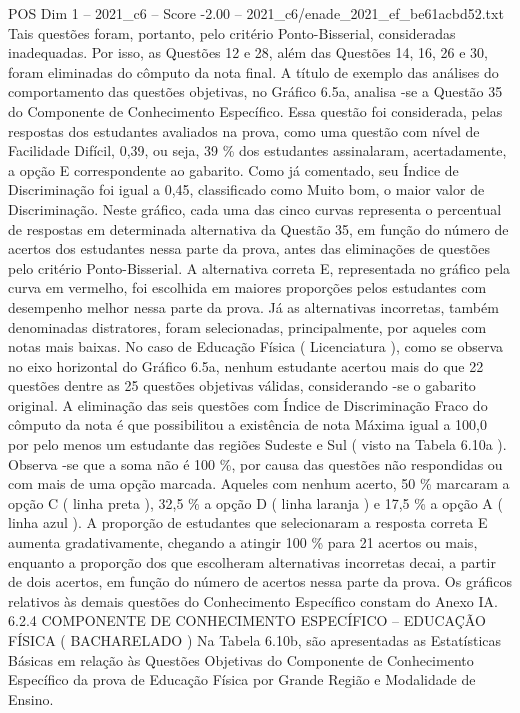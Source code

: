 \begin{textsample}{POS Dim 1 – 2021\_c6 – Score -2.00 – 2021\_c6/enade\_2021\_ef\_be61acbd52.txt}
Tais questões foram, portanto, pelo critério Ponto-Bisserial, consideradas inadequadas.
Por isso, as Questões 12 e 28, além das Questões 14, 16, 26 e 30, foram eliminadas do cômputo da nota final.
A título de exemplo das análises do comportamento das questões objetivas, no Gráfico 6.5a, analisa -se a Questão 35 do Componente de Conhecimento Específico.
Essa questão foi considerada, pelas respostas dos estudantes avaliados na prova, como uma questão com nível de Facilidade Difícil, 0,39, ou seja, 39 \% dos estudantes assinalaram, acertadamente, a opção E correspondente ao gabarito.
Como já comentado, seu Índice de Discriminação foi igual a 0,45, classificado como Muito bom, o maior valor de Discriminação.
Neste gráfico, cada uma das cinco curvas representa o percentual de respostas em determinada alternativa da Questão 35, em função do número de acertos dos estudantes nessa parte da prova, antes das eliminações de questões pelo critério Ponto-Bisserial.
A alternativa correta E, representada no gráfico pela curva em vermelho, foi escolhida em maiores proporções pelos estudantes com desempenho melhor nessa parte da prova.
Já as alternativas incorretas, também denominadas distratores, foram selecionadas, principalmente, por aqueles com notas mais baixas.
No caso de Educação Física ( Licenciatura ), como se observa no eixo horizontal do Gráfico 6.5a, nenhum estudante acertou mais do que 22 questões dentre as 25 questões objetivas válidas, considerando -se o gabarito original.
A eliminação das seis questões com Índice de Discriminação Fraco do cômputo da nota é que possibilitou a existência de nota Máxima igual a 100,0 por pelo menos um estudante das regiões Sudeste e Sul ( visto na Tabela 6.10a ).
Observa -se que a soma não é 100 \%, por causa das questões não respondidas ou com mais de uma opção marcada.
Aqueles com nenhum acerto, 50 \% marcaram a opção C ( linha preta ), 32,5 \% a opção D ( linha laranja ) e 17,5 \% a opção A ( linha azul ).
A proporção de estudantes que selecionaram a resposta correta E aumenta gradativamente, chegando a atingir 100 \% para 21 acertos ou mais, enquanto a proporção dos que escolheram alternativas incorretas decai, a partir de dois acertos, em função do número de acertos nessa parte da prova.
Os gráficos relativos às demais questões do Conhecimento Específico constam do Anexo IA. 6.2.4 COMPONENTE DE CONHECIMENTO ESPECÍFICO – EDUCAÇÃO FÍSICA ( BACHARELADO ) Na Tabela 6.10b, são apresentadas as Estatísticas Básicas em relação às Questões Objetivas do Componente de Conhecimento Específico da prova de Educação Física por Grande Região e Modalidade de Ensino.

\end{textsample}
